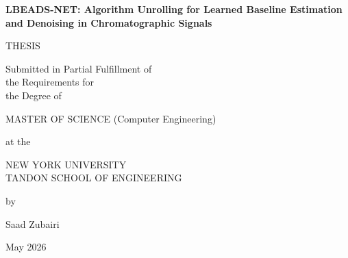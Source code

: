 \documentclass[12pt,draft,letterpaper]{report}
\newcommand{\thesistitle}{LBEADS-NET: Algorithm Unrolling for Learned Baseline Estimation and Denoising in Chromatographic Signals}
\newcommand{\thesisauthor}{Saad Zubairi}
\newcommand{\graddate}{May 2026} %
\begin{document}
%
\setcounter{page}{1}
\thispagestyle{empty}
%
\begin{center}
{\bfseries 
  {\large\thesistitle}
  \vspace{.25in}
  
  THESIS\\
  \vspace{.25in}
  
  \begin{doublespace}
  Submitted in Partial Fulfillment of\\
  the Requirements for\\
  the Degree of\\
  \end{doublespace}
  \vspace{.25in}
  
  MASTER OF SCIENCE (Computer Engineering)\\
  \vspace{.25in}
  
  at the \\
  \vspace{.1in}
  
  {\large
  NEW YORK UNIVERSITY\\
  \vspace{-0.05in}
  TANDON SCHOOL OF ENGINEERING\\
  }
  \vspace{.2in}
  
  by
  \vspace{.3in}

  \thesisauthor
  \vspace{.3in}

  \graddate
}

\end{center}

\vspace{0.2in}

\noindent
{}
\vspace{0.1in}

\noindent
\makebox[\textwidth]{\hfill\makebox[2.5in]{\hrulefill}}\\
\vspace{0.05in}

\noindent
{}
\end{document}
